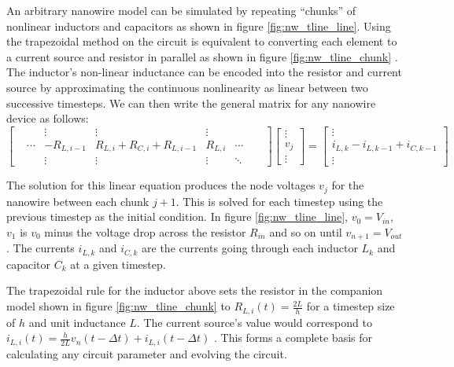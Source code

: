 An arbitrary nanowire model can be simulated by repeating ``chunks'' of nonlinear inductors and capacitors
as shown in figure \ref{fig:nw_tline_line}. Using the trapezoidal method on the circuit is equivalent 
to converting each element to a current source and resistor in parallel as shown in figure \ref{fig:nw_tline_chunk} \cite{numerical_integration}. The inductor's non-linear inductance can be encoded
into the resistor and current source by approximating the continuous nonlinearity as linear between two 
successive timesteps. We can then write the general matrix for any nanowire device as follows:
\begin{equation*}
    \begin{bmatrix}
     && \vdots & \vdots & \vdots & & & \\
    &\cdots & -R_{L, i-1} & R_{L, i} + R_{C, i} + R_{L, i-1} & R_{L, i} & \cdots\\
    && \vdots & \vdots & \vdots & \ddots
    \end{bmatrix}
    \begin{bmatrix}
    \vdots \\ v_j\\ \vdots
    \end{bmatrix}=
    \begin{bmatrix}
    \vdots \\ i_{L, k} - i_{L, k-1} + i_{C, k-1}\\ \vdots
    \end{bmatrix}
\end{equation*}

The solution for this linear equation produces the node voltages $v_j$ for the nanowire
between each chunk $j+1$. This is solved for each timestep using the previous timestep
as the initial condition.
In figure \ref{fig:nw_tline_line}, $v_0 = V_{in}$, $v_1$ is $v_0$ minus the voltage drop across
the resistor $R_{in}$ and so on until $v_{n+1}=V_{out}$. The currents $i_{L, k}$ and $i_{C, k}$ 
are the currents going through each inductor $L_k$ and capacitor $C_k$ at a given timestep.

The trapezoidal rule for the inductor above sets the resistor in the companion model shown in figure
\ref{fig:nw_tline_chunk} to $R_{L, i}(t) = \frac{2L}{h}$ for a timestep size of $h$ and unit inductance
$L$. The current source's value would correspond to $i_{L, i}(t) = \frac{h}{2L}v_n(t-\Delta t)+i_{L, i}(t-\Delta t)$ \cite{numerical_integration}. This forms a complete basis for calculating any circuit
parameter and evolving the circuit. 

